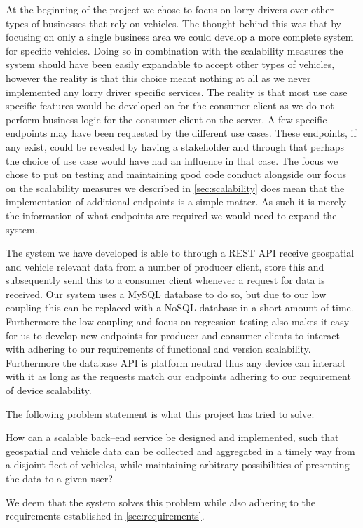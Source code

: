 At the beginning of the project we chose to focus on lorry drivers over other types of businesses that rely on vehicles.
The thought behind this was that by focusing on only a single business area we could develop a more complete system for specific vehicles.
Doing so in combination with the scalability measures the system should have been easily expandable to accept other types of vehicles, however the reality is that this choice meant nothing at all as we never implemented any lorry driver specific services.
The reality is that most use case specific features would be developed on for the consumer client as we do not perform business logic for the consumer client on the server.
A few specific endpoints may have been requested by the different use cases.
These endpoints, if any exist, could be revealed by having a stakeholder and through that perhaps the choice of use case would have had an influence in that case.
The focus we chose to put on testing and maintaining good code conduct alongside our focus on the scalability measures we described in \cref{sec:scalability} does mean that the implementation of additional endpoints is a simple matter.
As such it is merely the information of what endpoints are required we would need to expand the system.

\bigskip \noindent
The system we have developed is able to through a REST API receive geospatial and vehicle relevant data from a number of producer client, store this and subsequently send this to a consumer client whenever a request for data is received.
Our system uses a MySQL database to do so, but due to our low coupling this can be replaced with a NoSQL database in a short amount of time.
Furthermore the low coupling and focus on regression testing also makes it easy for us to develop new endpoints for producer and consumer clients to interact with adhering to our requirements of functional and version scalability.
Furthermore the database API is platform neutral thus any device can interact with it as long as the requests match our endpoints adhering to our requirement of device scalability.

The following problem statement is what this project has tried to solve:
\medskip
{\addtolength{\leftskip}{10mm}\addtolength{\rightskip}{10mm}\noindent\hrulefill\it

\noindent How can a scalable back--end service be designed and implemented,
such that geospatial and vehicle data can be collected and aggregated in a timely way from a disjoint fleet of vehicles,
while maintaining arbitrary possibilities of presenting the data to a given user?

\noindent\hrulefill

}
We deem that the system solves this problem while also adhering to the requirements established in \cref{sec:requirements}.
